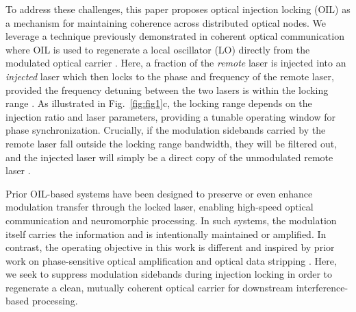 \documentclass[%
 aip,
 apl,
 amsmath,amssymb,
 reprint,%
 floatfix,
]{revtex4-1}
\begin{document}
To address these challenges, this paper proposes optical injection locking (OIL) as a mechanism for maintaining coherence across distributed optical nodes. We leverage a technique previously demonstrated in coherent optical communication where OIL is used to regenerate a local oscillator (LO) directly from the modulated optical carrier \cite{LiuSlavik2020OILTutorial,Liu2015JLT_HomodyneOFDM_OIL_CarrierRecovery}. Here, a fraction of the \emph{remote} laser is injected into an \emph{injected} laser which then locks to the phase and frequency of the remote laser, provided the frequency detuning between the two lasers is within the locking range \cite{Lang1982InjectionLockingProperties,Mogensen1985JQE_LockingStability_SemiconductorInjection}. As illustrated in Fig.~\ref{fig:fig1}c, the locking range depends on the injection ratio and laser parameters, providing a tunable operating window for phase synchronization. Crucially, if the modulation sidebands carried by the remote laser fall outside the locking range bandwidth, they will be filtered out, and the injected laser will simply be a direct copy of the unmodulated remote laser \cite{Liu2015JLT_HomodyneOFDM_OIL_CarrierRecovery}.

Prior OIL-based systems have been designed to preserve or even enhance modulation transfer through the locked laser, enabling high-speed optical communication and neuromorphic processing\cite{Lau2009JLT_OIL_ModulationTutorial,Dong2024RC_QDLaser,Muhlnickel2024CommunPhys_SpinVCSEL_RC}. In such systems, the modulation itself carries the information and is intentionally maintained or amplified. In contrast, the operating objective in this work is different and inspired by prior work on phase-sensitive optical amplification \cite{Slavk2010,Liu2018OILamp,Guan2018OILamp,Olsson2013OILamp} and optical data stripping \cite{Ibrahim2011OIL,Slavk2011OIL}. Here, we seek to suppress modulation sidebands \cite{Ibrahim2011OIL,Slavk2011OIL,Haldar2005OIL,Vainio2006OIL} during injection locking in order to regenerate a clean, mutually coherent optical carrier for downstream interference-based processing.
\end{document}
